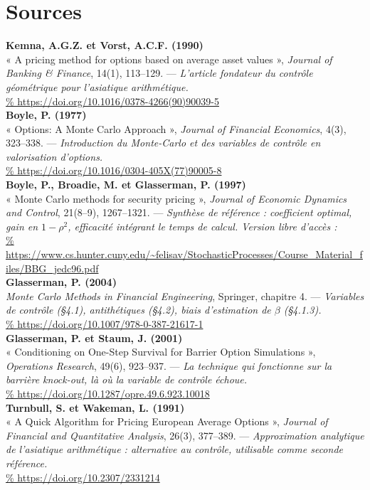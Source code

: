 \documentclass[11pt,a4paper]{article}
\begin{document}
\section{Sources}

\newcommand{\refitem}[3]{\textbf{#1}\\ #2 \\ {\footnotesize\url{#3}}\\[4pt]}

\refitem{Kemna, A.G.Z. et Vorst, A.C.F. (1990)}{%
« A pricing method for options based on average asset values », \emph{Journal
of Banking \& Finance}, 14(1), 113--129. --- \textsl{L'article fondateur du
contrôle géométrique pour l'asiatique arithmétique.}}{%
https://doi.org/10.1016/0378-4266(90)90039-5}

\refitem{Boyle, P. (1977)}{%
« Options: A Monte Carlo Approach », \emph{Journal of Financial Economics},
4(3), 323--338. --- \textsl{Introduction du Monte-Carlo et des variables de
contrôle en valorisation d'options.}}{%
https://doi.org/10.1016/0304-405X(77)90005-8}

\refitem{Boyle, P., Broadie, M. et Glasserman, P. (1997)}{%
« Monte Carlo methods for security pricing », \emph{Journal of Economic
Dynamics and Control}, 21(8--9), 1267--1321. --- \textsl{Synthèse de référence :
coefficient optimal, gain en $1-\rho^2$, efficacité intégrant le temps de
calcul. Version libre d'accès :}}{%
https://www.cs.hunter.cuny.edu/~felisav/StochasticProcesses/Course_Material_files/BBG_jedc96.pdf}

\refitem{Glasserman, P. (2004)}{%
\emph{Monte Carlo Methods in Financial Engineering}, Springer, chapitre 4.
--- \textsl{Variables de contrôle (\S 4.1), antithétiques (\S 4.2), biais
d'estimation de $\beta$ (\S 4.1.3).}}{%
https://doi.org/10.1007/978-0-387-21617-1}

\refitem{Glasserman, P. et Staum, J. (2001)}{%
« Conditioning on One-Step Survival for Barrier Option Simulations »,
\emph{Operations Research}, 49(6), 923--937. --- \textsl{La technique qui
fonctionne sur la barrière knock-out, là où la variable de contrôle
échoue.}}{%
https://doi.org/10.1287/opre.49.6.923.10018}

\refitem{Turnbull, S. et Wakeman, L. (1991)}{%
« A Quick Algorithm for Pricing European Average Options », \emph{Journal of
Financial and Quantitative Analysis}, 26(3), 377--389. --- \textsl{Approximation
analytique de l'asiatique arithmétique : alternative au contrôle, utilisable
comme seconde référence.}}{%
https://doi.org/10.2307/2331214}
\end{document}
